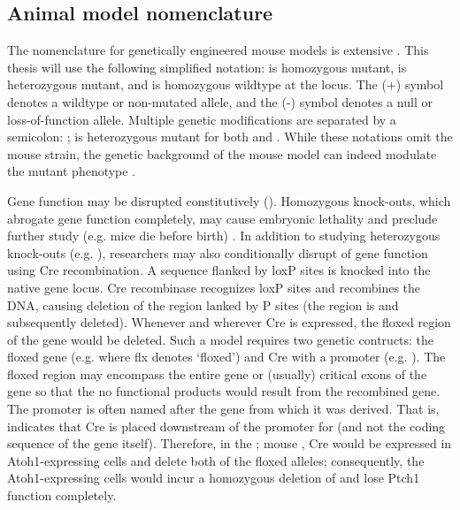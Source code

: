 \subsection{Animal model nomenclature}

The nomenclature for genetically engineered mouse models is extensive . This thesis will use the following simplified notation: \high{-/-} is homozygous mutant, \high{+/-} is heterozygous mutant, and \high{+/+} is homozygous wildtype at the  locus. The (+) symbol denotes a wildtype or non-mutated allele, and the (-) symbol denotes a null or loss-of-function allele. Multiple genetic modifications are separated by a semicolon: \high{+/-};\high{+/-} is heterozygous mutant for both  and . While these notations omit the mouse strain, the genetic background of the mouse model can indeed modulate the mutant phenotype .

Gene function may be disrupted constitutively (). Homozygous knock-outs, which abrogate gene function completely, may cause embryonic lethality and preclude further study (e.g. \high{-/-} mice die before birth) . In addition to studying heterozygous knock-outs (e.g. \high{+/-}), researchers may also conditionally disrupt of gene function using Cre recombination. A sequence flanked by loxP sites is knocked into the native gene locus. Cre recombinase recognizes loxP sites and recombines the DNA, causing deletion of the region lanked by P sites (the region is  and subsequently deleted). Whenever and wherever Cre is expressed, the floxed region of the gene would be deleted. Such a model requires two genetic contructs: the floxed gene (e.g.  where flx denotes `floxed') and Cre with a promoter (e.g. ). The floxed region may encompass the entire gene or (usually) critical exons of the gene so that the no functional products would result from the recombined gene. The promoter is often named after the gene from which it was derived. That is,  indicates that Cre is placed downstream of the promoter for  (and not the coding sequence of the  gene itself). Therefore, in the ; mouse , Cre would be expressed in Atoh1-expressing cells and delete both of the floxed  alleles; consequently, the Atoh1-expressing cells would incur a homozygous deletion of  and lose Ptch1 function completely.
		
